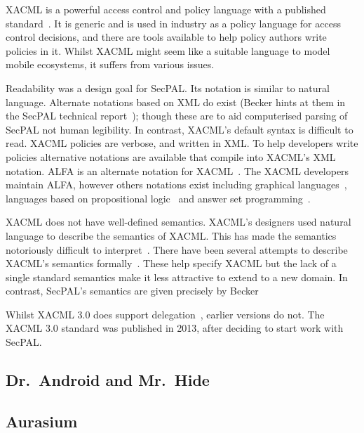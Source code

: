\documentclass[thesis.tex]{subfiles}
\begin{document}
XACML is a powerful access control and policy language with a published
standard~\cite{oasis_extensible_2013}. It is generic and is used in industry as
a policy language for access control decisions, and there are tools available to
help policy authors write policies in it. Whilst XACML might seem like a
suitable language to model mobile ecosystems, it suffers from various issues.

Readability was a design goal for SecPAL. Its notation is similar to natural
language. Alternate notations based on XML do exist (Becker hints at them in the
SecPAL technical report~\cite{becker_secpal:_2010}); though these are to aid
computerised parsing of SecPAL not human legibility. In contrast, XACML's
default syntax is difficult to read. XACML policies are verbose, and written in
XML. To help developers write policies alternative notations are available that
compile into XACML's XML notation. ALFA is an alternate notation for
XACML~\cite{oasis_xacml_technical_comitee_abbreviated_????}. The XACML
developers maintain ALFA, however others notations exist including graphical
languages~\cite{henrik_nergaard_scratch-based_2015}, languages based on
propositional logic~\cite{zhang_synthesising_2004} and answer set
programming~\cite{ramli_xacml_2012}.

XACML does not have well-defined semantics. XACML's designers used natural
language to describe the semantics of XACML. This has made the semantics
notoriously difficult to interpret~\cite{ramli_detecting_2015}. There have been
several attempts to describe XACML's semantics
formally~\cite{ramli_xacml_2012,ramli_logic_2014,bryans_reasoning_2005}. These
help specify XACML but the lack of a single standard semantics make it less
attractive to extend to a new domain. In contrast, SecPAL's semantics are given
precisely by Becker~\cite{becker_secpal:_2010}

Whilst XACML 3.0 does support delegation~\cite{oasis_xacml_2010}, earlier
versions do not. The XACML 3.0 standard was published in 2013, after deciding to
start work with SecPAL.


\subsection{Dr.~Android and Mr.~Hide}
\subsection{Aurasium}
\end{document}
